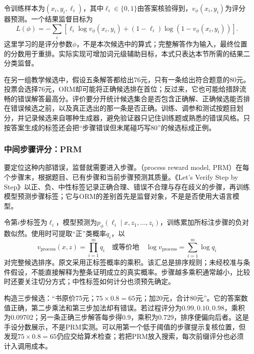 令训练样本为$(x_i,y_i,\ell_i)$，其中$\ell_i\in\{0,1\}$由答案核验得到，$v_{\phi}(x_i,y_i)$为评分器预测。一个结果监督目标为
\begin{equation}
 L(\phi)=-\sum_i\left[
 \ell_i\log v_{\phi}(x_i,y_i)
 +(1-\ell_i)\log(1-v_{\phi}(x_i,y_i))\right].
 \label{eq:nlp-execution-orm}
\end{equation}
这里学习的是评分参数$\phi$，不是本次候选中的算式；完整解答作为输入，最终位置的分数用于重排。实际实现可增加词元级辅助目标，本式只表达本节所需的结果二分类监督。

在另一组教学候选中，假设五条解答都给出76元，只有一条给出符合题意的80元。投票会选择76元，ORM却可能将正确候选排在首位；反过来，它也可能给措辞流畅的错误解答最高分。评价要分开统计候选集合是否包含正确解、正确候选能否排在错误候选之前，以及真正选出的那一条是否正确。训练、调参和测试按题目划分，并记录候选来自哪种生成器，避免验证器只记住训练题或熟悉的错误风格。只按答案生成的标签还会把“步骤错误但末尾碰巧写80”的候选标成正例。

\subsubsection{中间步骤评分：PRM}
\label{sec:nlp-execution-prm}

要定位这种内部错误，监督就需要进入步骤。（process reward model, PRM）在每个步骤末，根据题目、已有步骤和当前步骤预测其质量。《Let's Verify Step by Step》以正、负、中性标签记录正确合理、错误不合理与存在歧义的步骤，再训练模型预测步骤标签；它与ORM的差别首先是监督对象，不是是否使用大语言模型。

令第$i$步标签为$\ell_i$，模型预测为$p_{\phi}(\ell_i\mid x,z_1,\ldots,z_i)$，训练累加所标注步骤的负对数似然。使用时可提取“正”类概率$q_i$，以
\begin{equation}
 v_{\mathrm{process}}(x,z)=\prod_{i=1}^{m}q_i
 \quad\text{或等价地}\quad
 \log v_{\mathrm{process}}=\sum_{i=1}^{m}\log q_i
 \label{eq:nlp-execution-prm}
\end{equation}
对完整候选排序。原文采用正标签概率的乘积。该汇总是排序规则；未经校准与条件假设，不能直接解释为整条证明成立的真实概率。步骤越多乘积通常越小，比较时还要关注切分方式；中性标签如何计分也须预先确定。

构造三步候选：“书原价75元；$75\times0.8=65$元；加20元，合计80元”。它的答案数值正确，第二步乘法和第三步加法却有错误。若过程评分为$0.99,0.10,0.98$，乘积为0.09702；另一条正确三步解答每步得0.9，乘积为0.729，排序便偏向后者。这是手设分数展示，不是PRM实测。可以用第一个低于阈值的步骤提示复核位置，但发现$75\times0.8=65$仍应交给算术检查；若把PRM放入搜索，每次前缀评分也必须计入调用成本。

